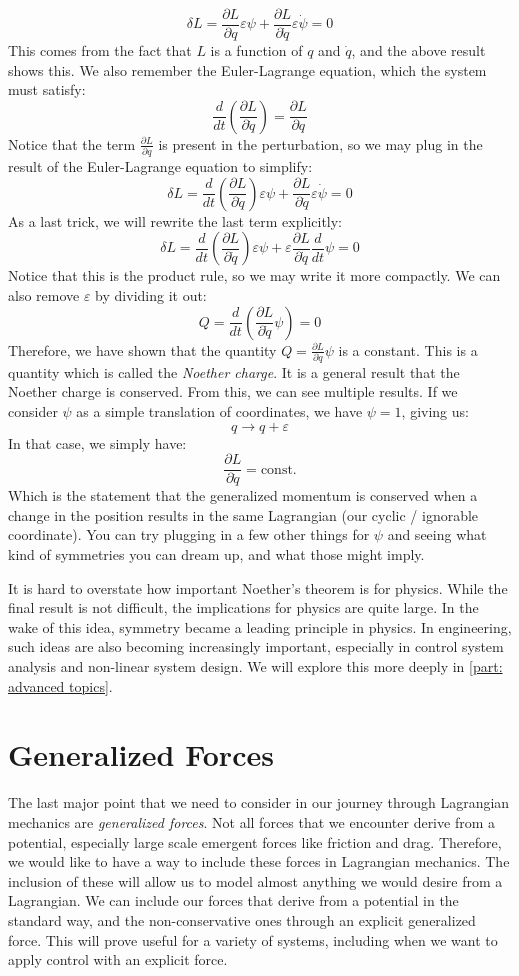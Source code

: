 $$\delta L=\frac{\partial L}{\partial q}\varepsilon\psi+\frac{\partial L}{\partial \dot{q}}\varepsilon\dot{\psi}=0$$
This comes from the fact that $L$ is a function of $q$ and $\dot{q}$, and the above result shows this. We also remember the Euler-Lagrange equation, which the system must satisfy:
$$\frac{d}{dt}\left(\frac{\partial L}{\partial \dot{q}}\right)=\frac{\partial L}{\partial q}$$
Notice that the term $\frac{\partial L}{\partial q}$ is present in the perturbation, so we may plug in the result of the Euler-Lagrange equation to simplify:
$$\delta L=\frac{d}{dt}\left(\frac{\partial L}{\partial \dot{q}}\right)\varepsilon\psi+\frac{\partial L}{\partial \dot{q}}\varepsilon\dot{\psi}=0$$
As a last trick, we will rewrite the last term explicitly:
$$\delta L=\frac{d}{dt}\left(\frac{\partial L}{\partial \dot{q}}\right)\varepsilon\psi+\varepsilon\frac{\partial L}{\partial \dot{q}}\frac{d}{dt}\psi=0$$
Notice that this is the product rule, so we may write it more compactly. We can also remove $\varepsilon$ by dividing it out:
$$Q=\frac{d}{dt}\left(\frac{\partial L}{\partial \dot{q}}\psi\right)=0$$
Therefore, we have shown that the quantity $Q=\frac{\partial L}{\partial \dot{q}}\psi$ is a constant. This is a quantity which is called the \textit{Noether charge}. It is a general result that the Noether charge is conserved. From this, we can see multiple results. If we consider $\psi$ as a simple translation of coordinates, we have $\psi=1$, giving us:
$$ q\rightarrow q+\varepsilon$$
In that case, we simply have:
$$\frac{\partial L}{\partial \dot{q}}=\text{const.}$$
Which is the statement that the generalized momentum is conserved when a change in the position results in the same \gls{Lagrangian} (our cyclic / ignorable coordinate). You can try plugging in a few other things for $\psi$ and seeing what kind of symmetries you can dream up, and what those might imply.

It is hard to overstate how important Noether's theorem is for physics. While the final result is not difficult, the implications for physics are quite large. In the wake of this idea, symmetry became a leading principle in physics. In engineering, such ideas are also becoming increasingly important, especially in control system analysis and non-linear system design. We will explore this more deeply in \autoref{part: advanced topics}.

\section{Generalized Forces}
The last major point that we need to consider in our journey through \gls{Lagrangian} mechanics are \textit{generalized  forces}. Not all forces that we encounter derive from a potential, especially large scale emergent forces like friction and drag. Therefore, we would like to have a way to include these forces in \gls{Lagrangian} mechanics. The inclusion of these will allow us to model almost anything we would desire from a \gls{Lagrangian}. We can include our forces that derive from a potential in the standard way, and the non-conservative ones through an explicit generalized force. This will prove useful for a variety of systems, including when we want to apply control with an explicit force.

